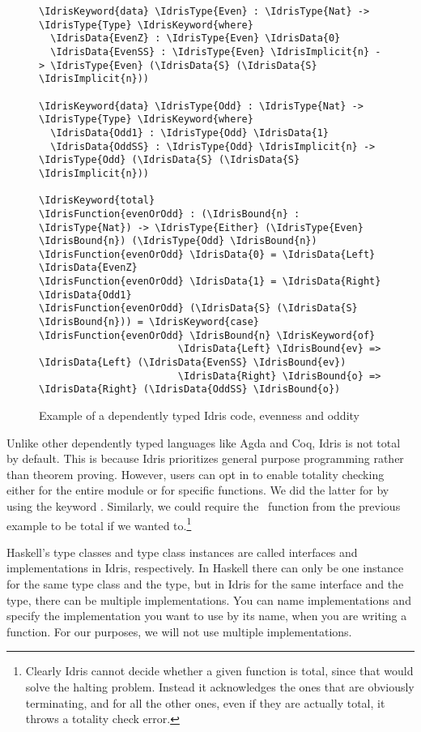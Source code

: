 \begin{figure}[ht]
\caption{Example of a dependently typed Idris code, evenness and oddity}
\label{code:evenodd}
\begin{Verbatim}[framesep=2mm, label=\footnotesize{\normalfont{Idris}}, labelposition=topline]
\IdrisKeyword{data} \IdrisType{Even} : \IdrisType{Nat} -> \IdrisType{Type} \IdrisKeyword{where}
  \IdrisData{EvenZ} : \IdrisType{Even} \IdrisData{0}
  \IdrisData{EvenSS} : \IdrisType{Even} \IdrisImplicit{n} -> \IdrisType{Even} (\IdrisData{S} (\IdrisData{S} \IdrisImplicit{n}))

\IdrisKeyword{data} \IdrisType{Odd} : \IdrisType{Nat} -> \IdrisType{Type} \IdrisKeyword{where}
  \IdrisData{Odd1} : \IdrisType{Odd} \IdrisData{1}
  \IdrisData{OddSS} : \IdrisType{Odd} \IdrisImplicit{n} -> \IdrisType{Odd} (\IdrisData{S} (\IdrisData{S} \IdrisImplicit{n}))

\IdrisKeyword{total}
\IdrisFunction{evenOrOdd} : (\IdrisBound{n} : \IdrisType{Nat}) -> \IdrisType{Either} (\IdrisType{Even} \IdrisBound{n}) (\IdrisType{Odd} \IdrisBound{n})
\IdrisFunction{evenOrOdd} \IdrisData{0} = \IdrisData{Left} \IdrisData{EvenZ}
\IdrisFunction{evenOrOdd} \IdrisData{1} = \IdrisData{Right} \IdrisData{Odd1}
\IdrisFunction{evenOrOdd} (\IdrisData{S} (\IdrisData{S} \IdrisBound{n})) = \IdrisKeyword{case} \IdrisFunction{evenOrOdd} \IdrisBound{n} \IdrisKeyword{of}
                        \IdrisData{Left} \IdrisBound{ev} => \IdrisData{Left} (\IdrisData{EvenSS} \IdrisBound{ev})
                        \IdrisData{Right} \IdrisBound{o} => \IdrisData{Right} (\IdrisData{OddSS} \IdrisBound{o})
\end{Verbatim}
\end{figure}

Unlike other dependently typed languages like Agda and Coq, Idris is not total
by default. This is because Idris prioritizes general purpose programming
rather than theorem proving. However, users can opt in to enable totality
checking either for the entire module or for specific functions.
We did the latter for  by using the keyword .
Similarly, we could require the \zip\ function from the previous example to be
total if we wanted to.\footnote{Clearly Idris cannot decide whether a given
function is total, since that would solve the halting problem. Instead it
acknowledges the ones that are obviously terminating, and for all the other
ones, even if they are actually total, it throws a totality check error.}

Haskell's type classes and type class instances are called interfaces and
implementations in Idris, respectively. In Haskell there can only be one
instance for the same type class and the type, but in Idris for the same
interface and the type, there can be multiple implementations. You can name
implementations and specify the implementation you want to use by its name,
when you are writing a function. For our purposes, we will not use multiple
implementations.

